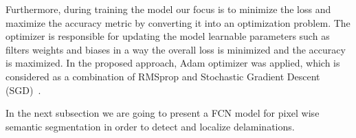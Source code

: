 Furthermore, during training the model our focus is to minimize the loss and maximize the accuracy metric by converting it into an optimization problem. 
The optimizer is responsible for updating the model learnable parameters such as filters weights and biases in a way the overall loss is minimized and the accuracy is maximized.
In the proposed approach, Adam optimizer was applied, which is considered as a combination of RMSprop and Stochastic Gradient Descent (SGD)~\cite{Kingma2015}. 

In the next subsection we are going to present a FCN model for pixel wise semantic segmentation in order to detect and localize delaminations.
